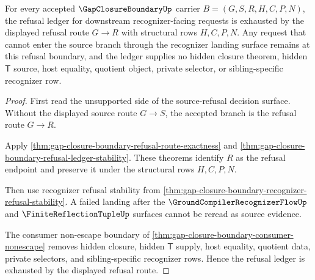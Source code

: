 \begin{theorem}
\label{thm:gap-closure-boundary-refusal-ledger-exhaustion}
For every accepted $\GapClosureBoundaryUp$ carrier $B=(G,S,R,H,C,P,N)$, the refusal ledger for downstream recognizer-facing requests is exhausted by the displayed refusal route $G \longrightarrow R$ with structural rows $H,C,P,N$. Any request that cannot enter the source branch through the recognizer landing surface remains at this refusal boundary, and the ledger supplies no hidden closure theorem, hidden $\mathsf{T}$ source, host equality, quotient object, private selector, or sibling-specific recognizer row.
\end{theorem}
\begin{proof}
First read the unsupported side of the source-refusal decision surface. Without the displayed source route $G \longrightarrow S$, the accepted branch is the refusal route $G \longrightarrow R$.

Apply \autoref{thm:gap-closure-boundary-refusal-route-exactness} and \autoref{thm:gap-closure-boundary-refusal-ledger-stability}. These theorems identify $R$ as the refusal endpoint and preserve it under the structural rows $H,C,P,N$.

Then use recognizer refusal stability from \autoref{thm:gap-closure-boundary-recognizer-refusal-stability}. A failed landing after the $\GroundCompilerRecognizerFlowUp$ and $\FiniteReflectionTupleUp$ surfaces cannot be reread as source evidence.

The consumer non-escape boundary of \autoref{thm:gap-closure-boundary-consumer-nonescape} removes hidden closure, hidden $\mathsf{T}$ supply, host equality, quotient data, private selectors, and sibling-specific recognizer rows. Hence the refusal ledger is exhausted by the displayed refusal route.
\end{proof}

